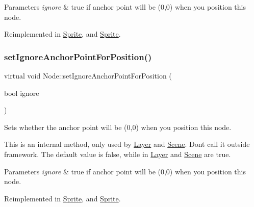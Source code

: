 \begin{DoxyParams}{Parameters}
{\em ignore} & true if anchor point will be (0,0) when you position this node. \\
\hline
\end{DoxyParams}


Reimplemented in \hyperlink{classSprite_a0466d4642ed98aefe0febeb4a20bb78f}{Sprite}, and \hyperlink{classSprite_a6cbc37c64ba7d2f0d37070c1c1a750ec}{Sprite}.

\mbox{\label{classNode_a0bedb5e314188f86e32fd986c449b28b}} 
\subsubsection{\texorpdfstring{set\+Ignore\+Anchor\+Point\+For\+Position()}{setIgnoreAnchorPointForPosition()}\hspace{0.1cm}{\footnotesize\ttfamily [2/2]}}
{\footnotesize\ttfamily virtual void Node\+::set\+Ignore\+Anchor\+Point\+For\+Position (\begin{DoxyParamCaption}\item[{bool}]{ignore }\end{DoxyParamCaption})\hspace{0.3cm}{\ttfamily [virtual]}}

Sets whether the anchor point will be (0,0) when you position this node.

This is an internal method, only used by \hyperlink{classLayer}{Layer} and \hyperlink{classScene}{Scene}. Don\textquotesingle{}t call it outside framework. The default value is false, while in \hyperlink{classLayer}{Layer} and \hyperlink{classScene}{Scene} are true.


\begin{DoxyParams}{Parameters}
{\em ignore} & true if anchor point will be (0,0) when you position this node. \\
\hline
\end{DoxyParams}


Reimplemented in \hyperlink{classSprite_a0466d4642ed98aefe0febeb4a20bb78f}{Sprite}, and \hyperlink{classSprite_a6cbc37c64ba7d2f0d37070c1c1a750ec}{Sprite}.

\mbox{\label{classNode_aee4e616c2d55b722226aae1e68b4946f}} 
